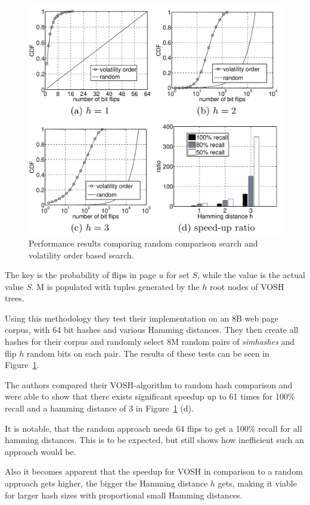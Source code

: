 \documentclass[12pt,a4paper,DIV=calc]{scrartcl}
\begin{document}
\begin{figure}[H]
    \includegraphics[scale=0.33]{./gfx/vosh-performance.png}
    \centering
    \caption{Performance results comparing random comparison search and volatility order based search.}\label{fig:vosh-performance}
\end{figure}

The key is the probability of flips in page $u$ for set $S$, while the value is the actual value $S$.
M is populated with tuples generated by the $h$ root nodes of VOSH trees.

Using this methodology they test their implementation on an 8B web page corpus, with 64 bit hashes and various Hamming distances.
They then create all hashes for their corpus and randomly select 8M random pairs of \emph{simhashes} and flip $h$ random bits on each pair.
The results of these tests can be seen in Figure~\ref{fig:vosh-performance}.

The authors compared their VOSH-algorithm to random hash comparison and were able to show that there exists significant speedup up to 61 times for 100\% recall and a hamming distance of 3 in Figure~\ref{fig:vosh-performance} (d).

It is notable, that the random approach needs 64 flips to get a 100\% recall for all hamming distances.
This is to be expected, but still shows how inefficient such an approach would be.

Also it becomes apparent that the speedup for VOSH in comparison to a random approach gets higher, the bigger the Hamming distance $h$ gets, making it viable for larger hash sizes with proportional small Hamming distances.
\end{document}
